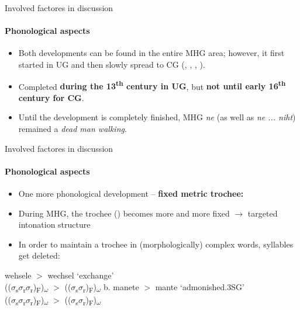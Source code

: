 \documentclass[xcolor=table, compress, %
handout
]{beamer}
\begin{document}
\begin{frame}{Involved factores in discussion}
\framesubtitle{Phonological aspects}

\begin{itemize}
    \item Both developments can be found in the entire MHG area; however, it first started in UG and then slowly spread to CG (\citealt{Triwunatz1913}, \citealt{lindgren53}, \citealt{Klein2005}, \citealt{Buethe-Scheider2017}).
    \item Completed \textbf{during the 13\textsuperscript{th} century in UG}, but \textbf{not until early 16\textsuperscript{th} century for CG}. 
    \item[\Radioactivity] Until the development is completely finished, MHG \textit{ne} (as well as \textit{ne ... niht}) remained a \textit{dead man walking}.
\end{itemize}

\end{frame}

\begin{frame}{Involved factores in discussion}
\framesubtitle{Phonological aspects}

\begin{itemize}
    \item One more phonological development – \textbf{fixed metric trochee:} 
    \item During MHG, the trochee () becomes more and more fixed $\rightarrow$ targeted intonation structure
    \item In order to maintain a trochee in (morphologically) complex words, syllables get deleted:
\end{itemize}

\pex
\a
wehsele   $>$  wechsel\alert{\emptyset} ‘exchange’\\
(($\sigma$\textsubscript{s}$\sigma$\textsubscript{r}\alert{$\sigma$\textsubscript{r}})\textsubscript{F})\textsubscript{$\omega$} $>$   (($\sigma$\textsubscript{s}$\sigma$\textsubscript{r}\alert{\emptyset})\textsubscript{F})\textsubscript{$\omega$}
\a
b. manete $>$ man\alert{\emptyset}te ‘admonished.{\textsc{3SG}}’\\
(($\sigma$\textsubscript{s}\alert{$\sigma$\textsubscript{r}}$\sigma$\textsubscript{r})\textsubscript{F})\textsubscript{$\omega$} $>$   (($\sigma$\textsubscript{s}\alert{\emptyset}$\sigma$\textsubscript{r})\textsubscript{F})\textsubscript{$\omega$}
\xe

\end{frame}
\end{document}

